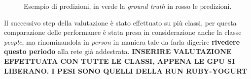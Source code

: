 \begin{figure}[]
{{\begin{minipage}[b][][t]{.3\textwidth}
        \end{minipage}
    }
    }
    \caption{Esempio di predizioni, in verde la \textit{ground truth} in rosso le predizioni.} 
    \label{fig:prediction_test_first} 
\end{figure}


Il successivo step della valutazione è stato effettuato su più classi, per questa comparazione delle performance è stata presa in considerazione anche la classe \textit{people}, ma rinominandola in \textit{person} in maniera tale da farla digerire \textbf{rivedere questo periodo} alla rete già addestrata.
\textbf{INSERIRE VALUTAZIONE EFFETTUATA CON TUTTE LE CLASSI, APPENA LE GPU SI LIBERANO. I PESI SONO QUELLI DELLA RUN RUBY-YOGURT}
